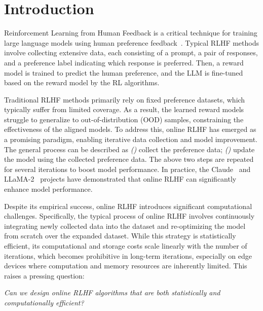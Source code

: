 \section{Introduction}
\label{sec:introduction}

Reinforcement Learning from Human Feedback is a critical technique for training large language models using human preference feedback~\citep{NeurIPS'22:Ouyang-InstructGPT,arXiv'22:Bai-RLHF}. Typical RLHF methods involve collecting extensive data, each consisting of a prompt, a pair of responses, and a preference label indicating which response is preferred. Then, a reward model is trained to predict the human preference, and the LLM is fine-tuned based on the reward model by the RL algorithms.

Traditional RLHF methods primarily rely on fixed preference datasets, which typically suffer from limited coverage. As a result, the learned reward models struggle to generalize to out-of-distribution (OOD) samples, constraining the effectiveness of the aligned models. To address this, online RLHF has emerged as a promising paradigm, enabling iterative data collection and model improvement. The general process can be described as \setcounter{romancounter}{1}\textit{()} collect the preference data; \setcounter{romancounter}{2}\textit{()} update the model using the collected preference data. The above two steps are repeated for several iterations to boost model performance. In practice, the Claude~\citep{arXiv'22:Bai-RLHF} and LLaMA-2~\citep{arXiv'23:llama-2} projects have demonstrated that online RLHF can significantly enhance model performance.

Despite its empirical success, online RLHF introduces significant computational challenges. Specifically, the typical process of online RLHF involves continuously integrating newly collected data into the dataset and re-optimizing the model from scratch over the expanded dataset. While this strategy is statistically efficient, its computational and storage costs scale linearly with the number of iterations, which becomes prohibitive in long-term iterations, especially on edge devices where computation and memory resources are inherently limited. This raises a pressing question:
\begin{center}
    \emph{Can we design online RLHF algorithms that are both statistically and computationally efficient?}
\end{center}

